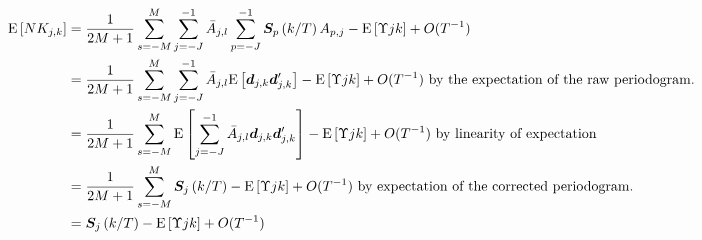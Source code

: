 \documentclass[main_document.tex]{subfiles}
\begin{document}
\begin{align*}
	\E{N K_{j,k}} &= \frac{\displaystyle 1}{\displaystyle 2M+1}\sum_{s=-M}^{M} \scalesum{j} \invA{j}{l}  \scalesum{p} \CEWS{p}{k} A_{p,j} - \E{\Upsilon{j}{k}} + O(T^{-1}) \\
				&= \frac{\displaystyle 1}{\displaystyle 2M+1}\sum_{s=-M}^{M} \scalesum{j} \invA{j}{l}  \E{\coeffs{j}{k}\coeffs{j}{k}'} - \E{\Upsilon{j}{k}} + O(T^{-1}) \text{ by the expectation of the raw periodogram. }\\
				&= \frac{\displaystyle 1}{\displaystyle 2M+1}\sum_{s=-M}^{M} \E{\scalesum{j} \invA{j}{l} \coeffs{j}{k}\coeffs{j}{k}'} - \E{\Upsilon{j}{k}} + O(T^{-1}) \text{ by linearity of expectation}\\
				&= \frac{\displaystyle 1}{\displaystyle 2M+1}\sum_{s=-M}^{M} \CEWS{j}{k} - \E{\Upsilon{j}{k}} + O(T^{-1}) \text{ by expectation of the corrected periodogram.}\\
				&= \CEWS{j}{k} - \E{\Upsilon{j}{k}} + O(T^{-1}) 
\end{align*}
\end{document}
